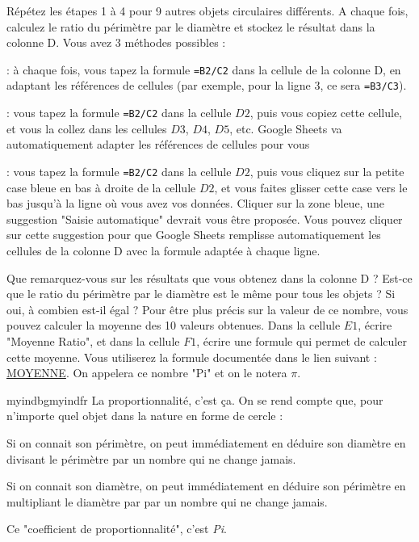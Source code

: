 \documentclass{exam}
\begin{document}
\begin{questions}
\question Répétez les étapes 1 à 4 pour 9 autres objets circulaires différents. A chaque fois, calculez le ratio du périmètre par le diamètre et stockez le résultat dans la colonne D. Vous avez 3 méthodes possibles : 
\begin{compactitem}
  \item {} : à chaque fois, vous tapez la formule \verb|=B2/C2| dans la cellule de la colonne D, en adaptant les références de cellules (par exemple, pour la ligne 3, ce sera \verb|=B3/C3|).
  \item {} : vous tapez la formule \verb|=B2/C2| dans la cellule $D2$, puis vous copiez cette cellule, et vous la collez dans les cellules $D3$, $D4$, $D5$, etc. Google Sheets va automatiquement adapter les références de cellules pour vous
  \item {} : vous tapez la formule \verb|=B2/C2| dans la cellule $D2$, puis vous cliquez sur la petite case bleue en bas à droite de la cellule $D2$, et vous faites glisser cette case vers le bas jusqu'à la ligne où vous avez vos données. Cliquer sur la zone bleue, une suggestion "Saisie automatique" devrait vous être proposée. Vous pouvez cliquer sur cette suggestion pour que Google Sheets remplisse automatiquement les cellules de la colonne D avec la formule adaptée à chaque ligne.
\end{compactitem}
\question Que remarquez-vous sur les résultats que vous obtenez dans la colonne D ? Est-ce que le ratio du périmètre par le diamètre est le même pour tous les objets ? Si oui, à combien est-il égal ? Pour être plus précis sur la valeur de ce nombre, vous pouvez calculer la moyenne des 10 valeurs obtenues. Dans la cellule $E1$, écrire "Moyenne Ratio", et dans la cellule $F1$, écrire une formule qui permet de calculer cette moyenne. Vous utiliserez la formule documentée dans le lien suivant : \href{https://support.google.com/docs/answer/3093615?hl=fr}{MOYENNE}. On appelera ce nombre "Pi" et on le notera $\pi$.

\begin{Indication}{myindbg}{myindfr}
  La proportionnalité, c'est ça. On se rend compte que, pour n'importe quel objet dans la nature en forme de cercle : 
  \begin{compactitem}
  \item Si on connait son périmètre, on peut immédiatement en déduire son diamètre en divisant le périmètre par un nombre qui ne change jamais.
  \item Si on connait son diamètre, on peut immédiatement en déduire son périmètre en multipliant le diamètre par par un nombre qui ne change jamais.
  \end{compactitem}
  Ce "coefficient de proportionnalité", c'est \textit{Pi}. 
\end{Indication}


\end{questions}
\end{document}
